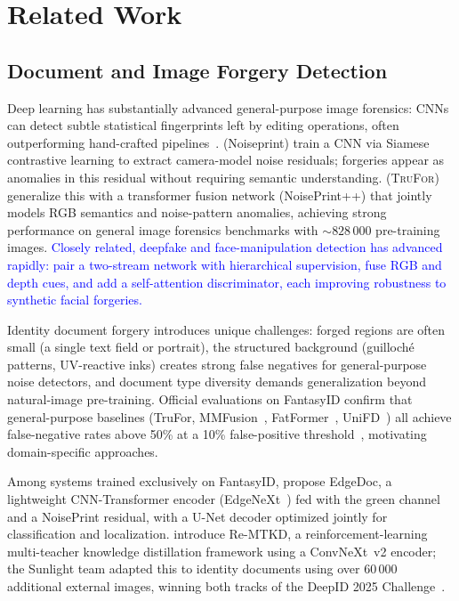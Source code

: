 \documentclass[final,5p,times,twocolumn,number]{elsarticle}
\newcommand{\revB}[1]{\textcolor{blue}{#1}}
\begin{document}

\section{Related Work}
\label{sec:related}

\subsection{Document and Image Forgery Detection}

Deep learning has substantially advanced general-purpose image forensics:
CNNs can detect subtle statistical fingerprints left by editing operations,
often outperforming hand-crafted pipelines~\citep{mantranet2019}.
\citet{cozzolino2020noiseprint} (Noiseprint) train a CNN via Siamese
contrastive learning to extract camera-model noise residuals; forgeries appear
as anomalies in this residual without requiring semantic understanding.
\citet{trufor2023} (\textsc{TruFor}) generalize this with a transformer fusion
network (NoisePrint++) that jointly models RGB semantics and noise-pattern
anomalies, achieving strong performance on general image forensics benchmarks
with ${\sim}828\,000$ pre-training images. \revB{Closely related, deepfake and
face-manipulation detection has advanced rapidly:
\citet{liang2023twostream} pair a two-stream network with hierarchical
supervision, \citet{leporoni2024guided} fuse {RGB} and depth cues, and
\citet{wang2024deepfake} add a self-attention discriminator, each improving
robustness to synthetic facial forgeries.}

Identity document forgery introduces unique challenges: forged regions are
often small (a single text field or portrait), the structured background
(guilloché patterns, UV-reactive inks) creates strong false negatives for
general-purpose noise detectors, and document type diversity demands
generalization beyond natural-image pre-training. Official evaluations on
FantasyID confirm that general-purpose baselines (TruFor, MMFusion~\citep{mmfusion2024},
FatFormer~\citep{fatformer2024}, UniFD~\citep{unifd2023}) all achieve
false-negative rates above 50\% at a 10\% false-positive
threshold~\citep{fantasyid2024}, motivating domain-specific approaches.

Among systems trained exclusively on FantasyID, \citet{edgedoc2025} propose
EdgeDoc, a lightweight CNN-Transformer encoder (EdgeNeXt~\citep{edgenext2022}) fed with the green
channel and a NoisePrint residual, with a U-Net decoder optimized jointly for
classification and localization. \citet{remtkd2025} introduce Re-MTKD, a
reinforcement-learning multi-teacher knowledge distillation framework using a
ConvNeXt~v2 encoder; the Sunlight team adapted this to identity documents using
over 60\,000 additional external images, winning both tracks of the DeepID
2025 Challenge~\citep{deepid2025challenge}.
\end{document}
